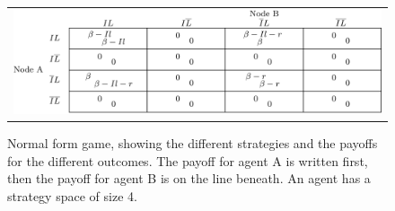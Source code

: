\begin{figure}[h]
\centering
\begin{tabular}{@{}c@{}}
\includegraphics[width=1.0\textwidth]{../Figures/FirstGameWithParameters.png}
\end{tabular}
\caption{\label{fig:FirstGameTheoryModel} Normal form game, showing the different strategies and the payoffs  for the different outcomes. The payoff for agent A is written first, then the payoff for agent B is on the line beneath.
 An agent has a strategy space of size 4. }
\end{figure}

